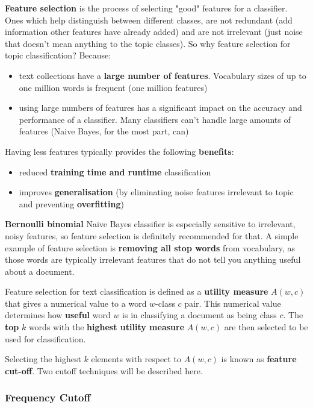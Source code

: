 \documentclass{article}
\begin{document}
\textbf{Feature selection} is the process of selecting "good" features for a classifier. Ones which help distinguish between different classes, are not redundant (add information other features have already added) and are not irrelevant (just noise that doesn't mean anything to the topic classes). So why feature selection for topic classification? Because:
\begin{itemize}
	\item text collections have a \textbf{large number of features}. Vocabulary sizes of up to one million words is frequent (one million features)
	\item using large numbers of features has a significant impact on the accuracy and performance of a classifier. Many classifiers can't handle large amounts of features (Naive Bayes, for the most part, can)
\end{itemize}
Having less features typically provides the following \textbf{benefits}:
\begin{itemize}
	\item reduced \textbf{training time and runtime} classification
	\item improves \textbf{generalisation} (by eliminating noise features irrelevant to topic and preventing \textbf{overfitting})
\end{itemize}
\textbf{Bernoulli binomial} Naive Bayes classifier is especially sensitive to irrelevant, noisy features, so feature selection is definitely recommended for that. A simple example of feature selection is \textbf{removing all stop words} from vocabulary, as those words are typically irrelevant features that do not tell you anything useful about a document.

Feature selection for text classification is defined as a \textbf{utility measure} $A(w, c)$ that gives a numerical value to a word $w$-class $c$ pair. This numerical value determines how \textbf{useful} word $w$ is in classifying a document as being class $c$. The \textbf{top} $k$ words with the \textbf{highest utility measure} $A(w, c)$ are then selected to be used for classification.

Selecting the highest $k$ elements with respect to $A(w, c)$ is known as \textbf{feature cut-off}. Two cutoff techniques will be described here.

\subsubsection{Frequency Cutoff}
\end{document}
